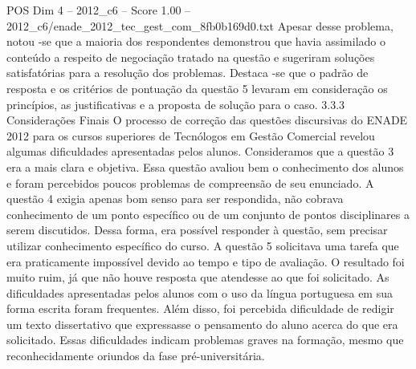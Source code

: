 \begin{textsample}{POS Dim 4 – 2012\_c6 – Score 1.00 – 2012\_c6/enade\_2012\_tec\_gest\_com\_8fb0b169d0.txt}
Apesar desse problema, notou -se que a maioria dos respondentes demonstrou que havia assimilado o conteúdo a respeito de negociação tratado na questão e sugeriram soluções satisfatórias para a resolução dos problemas.
Destaca -se que o padrão de resposta e os critérios de pontuação da questão 5 levaram em consideração os princípios, as justificativas e a proposta de solução para o caso. 3.3.3 Considerações Finais O processo de correção das questões discursivas do ENADE 2012 para os cursos superiores de Tecnólogos em Gestão Comercial revelou algumas dificuldades apresentadas pelos alunos.
Consideramos que a questão 3 era a mais clara e objetiva.
Essa questão avaliou bem o conhecimento dos alunos e foram percebidos poucos problemas de compreensão de seu enunciado.
A questão 4 exigia apenas bom senso para ser respondida, não cobrava conhecimento de um ponto específico ou de um conjunto de pontos disciplinares a serem discutidos.
Dessa forma, era possível responder à questão, sem precisar utilizar conhecimento específico do curso.
A questão 5 solicitava uma tarefa que era praticamente impossível devido ao tempo e tipo de avaliação.
O resultado foi muito ruim, já que não houve resposta que atendesse ao que foi solicitado.
As dificuldades apresentadas pelos alunos com o uso da língua portuguesa em sua forma escrita foram frequentes.
Além disso, foi percebida dificuldade de redigir um texto dissertativo que expressasse o pensamento do aluno acerca do que era solicitado.
Essas dificuldades indicam problemas graves na formação, mesmo que reconhecidamente oriundos da fase pré-universitária.

\end{textsample}
